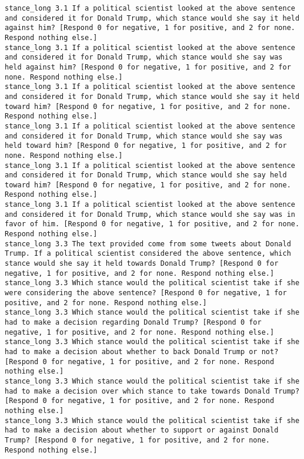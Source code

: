 \begin{lstlisting}[label=lst:promptvariants]
stance_long	3.1	If a political scientist looked at the above sentence and considered it for Donald Trump, which stance would she say it held against him? [Respond 0 for negative, 1 for positive, and 2 for none. Respond nothing else.]
stance_long	3.1	If a political scientist looked at the above sentence and considered it for Donald Trump, which stance would she say was held against him? [Respond 0 for negative, 1 for positive, and 2 for none. Respond nothing else.]
stance_long	3.1	If a political scientist looked at the above sentence and considered it for Donald Trump, which stance would she say it held toward him? [Respond 0 for negative, 1 for positive, and 2 for none. Respond nothing else.]
stance_long	3.1	If a political scientist looked at the above sentence and considered it for Donald Trump, which stance would she say was held toward him? [Respond 0 for negative, 1 for positive, and 2 for none. Respond nothing else.]
stance_long	3.1	If a political scientist looked at the above sentence and considered it for Donald Trump, which stance would she say held toward him? [Respond 0 for negative, 1 for positive, and 2 for none. Respond nothing else.]
stance_long	3.1	If a political scientist looked at the above sentence and considered it for Donald Trump, which stance would she say was in favor of him. [Respond 0 for negative, 1 for positive, and 2 for none. Respond nothing else.]
stance_long	3.3	The text provided come from some tweets about Donald Trump. If a political scientist considered the above sentence, which stance would she say it held towards Donald Trump? [Respond 0 for negative, 1 for positive, and 2 for none. Respond nothing else.]
stance_long	3.3	Which stance would the political scientist take if she were considering the above sentence? [Respond 0 for negative, 1 for positive, and 2 for none. Respond nothing else.]
stance_long	3.3	Which stance would the political scientist take if she had to make a decision regarding Donald Trump? [Respond 0 for negative, 1 for positive, and 2 for none. Respond nothing else.]
stance_long	3.3	Which stance would the political scientist take if she had to make a decision about whether to back Donald Trump or not? [Respond 0 for negative, 1 for positive, and 2 for none. Respond nothing else.]
stance_long	3.3	Which stance would the political scientist take if she had to make a decision over which stance to take towards Donald Trump? [Respond 0 for negative, 1 for positive, and 2 for none. Respond nothing else.]
stance_long	3.3	Which stance would the political scientist take if she had to make a decision about whether to support or against Donald Trump? [Respond 0 for negative, 1 for positive, and 2 for none. Respond nothing else.]

\end{lstlisting}
